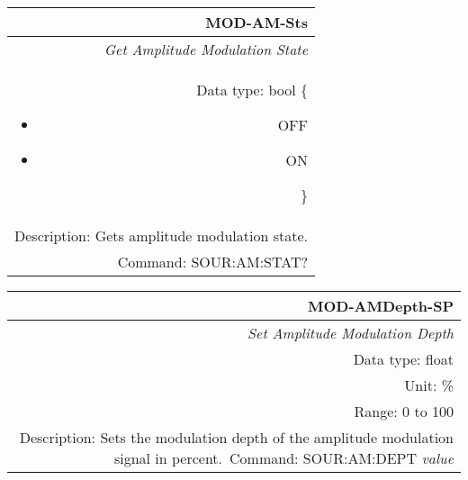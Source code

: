 \documentclass[openany]{article}
\begin{document}
		\begin{tabular}{N}
			\hline
			\bfseries MOD-AM-Sts \\ \hline
			\emph{Get Amplitude Modulation State} \\
			Data type: bool \{\begin{itemize}[noitemsep]
				\small
				\item[] OFF
				\item[] ON
			\end{itemize}\} \\
			Description: Gets amplitude modulation state. \\
			Command: SOUR:AM:STAT? \\
			
		\end{tabular}
%
		\begin{tabular}{N}
			\hline
			\bfseries MOD-AMDepth-SP \\ \hline
			\emph{Set Amplitude Modulation Depth} \\
			Data type: float \\
			Unit: \% \\
			Range: 0 to 100 \\
			Description: Sets the modulation depth of the amplitude modulation signal in percent.\
			Command: SOUR:AM:DEPT \emph{value} \\
			
		\end{tabular}
\end{document}
